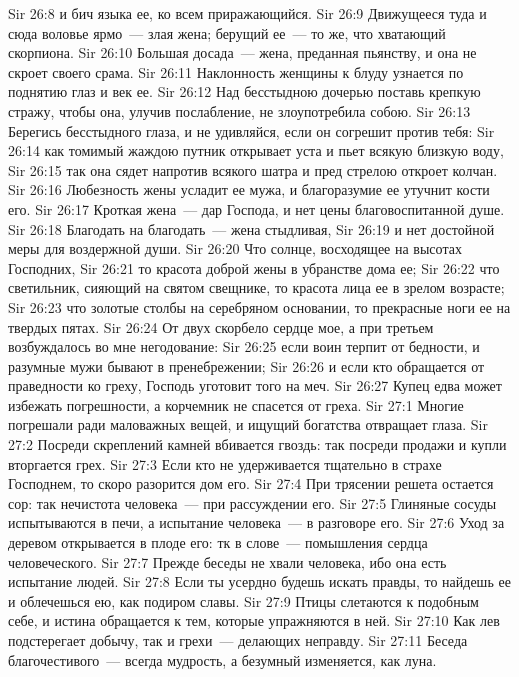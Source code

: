 \vs Sir 26:8 и бич языка ее, ко всем приражающийся.
\vs Sir 26:9 Движущееся туда и сюда воловье ярмо~--- злая жена; берущий ее~--- то же, что хватающий скорпиона.
\vs Sir 26:10 Большая досада~--- жена, преданная пьянству, и она не скроет своего срама.
\vs Sir 26:11 Наклонность женщины к блуду узнается по поднятию глаз и век ее.
\vs Sir 26:12 Над бесстыдною дочерью поставь крепкую стражу, чтобы она, улучив послабление, не злоупотребила собою.
\vs Sir 26:13 Берегись бесстыдного глаза, и не удивляйся, если он согрешит против тебя:
\vs Sir 26:14 как томимый жаждою путник открывает уста и пьет всякую близкую воду,
\vs Sir 26:15 так она сядет напротив всякого шатра и пред стрелою откроет колчан.
\vs Sir 26:16 Любезность жены усладит ее мужа, и благоразумие ее утучнит кости его.
\vs Sir 26:17 Кроткая жена~--- дар Господа, и нет цены благовоспитанной душе.
\vs Sir 26:18 Благодать на благодать~--- жена стыдливая,
\vs Sir 26:19 и нет достойной меры для воздержной души.
\vs Sir 26:20 Что солнце, восходящее на высотах Господних,
\vs Sir 26:21 то красота доброй жены в убранстве дома ее;
\vs Sir 26:22 что светильник, сияющий на святом свещнике, то красота лица ее в зрелом возрасте;
\vs Sir 26:23 что золотые столбы на серебряном основании, то прекрасные ноги ее на твердых пятах.
\rsbpar\vs Sir 26:24 От двух скорбело сердце мое, а при третьем возбуждалось во мне негодование:
\vs Sir 26:25 если воин терпит от бедности, и разумные мужи бывают в пренебрежении;
\vs Sir 26:26 и если кто обращается от праведности ко греху, Господь уготовит того на меч.
\vs Sir 26:27 Купец едва может избежать погрешности, а корчемник не спасется от греха.
\vs Sir 27:1 Многие погрешали ради маловажных вещей, и ищущий богатства отвращает глаза.
\vs Sir 27:2 Посреди скреплений камней вбивается гвоздь: так посреди продажи и купли вторгается грех.
\vs Sir 27:3 Если кто не удерживается тщательно в страхе Господнем, то скоро разорится дом его.
\vs Sir 27:4 При трясении решета остается сор: так нечистота человека~--- при рассуждении его.
\vs Sir 27:5 Глиняные сосуды испытываются в печи, а испытание человека~--- в разговоре его.
\vs Sir 27:6 Уход за деревом открывается в плоде его: тк в слове~--- помышления сердца человеческого.
\vs Sir 27:7 Прежде беседы не хвали человека, ибо она есть испытание людей.
\vs Sir 27:8 Если ты усердно будешь искать правды, то найдешь ее и облечешься ею, как подиром славы.
\vs Sir 27:9 Птицы слетаются к подобным себе, и истина обращается к тем, которые упражняются в ней.
\vs Sir 27:10 Как лев подстерегает добычу, так и грехи~--- делающих неправду.
\rsbpar\vs Sir 27:11 Беседа благочестивого~--- всегда мудрость, а безумный изменяется, как луна.
